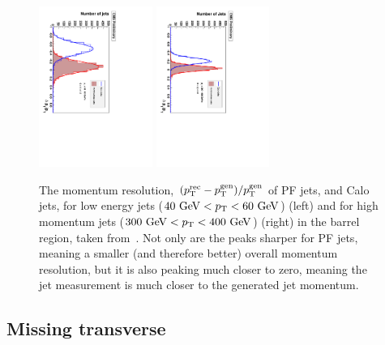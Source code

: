 \begin{figure}[htbp]
  \begin{center}
  \includegraphics[width=0.33\textwidth, angle =90]{Figures/detector/MomResPFjetCaloJet_lowPt.pdf}
  \includegraphics[width=0.33\textwidth, angle =90]{Figures/detector/MomResPFjetCaloJet_highPt.pdf}
  \caption{The momentum resolution, 
  $(p_{\text{T}}^{\text{rec}} - p_{\text{T}}^{\text{gen}})/p_{\text{T}}^{\text{gen}}$ of \ac{PF} jets, and Calo jets, for low energy jets ($40~\mathrm{GeV}<p_{\text{T}}<60~\mathrm{GeV}$) (left) and for high momentum jets ($300~\mathrm{GeV}<p_{\text{T}}<400~\mathrm{GeV}$) (right) in the barrel region, taken from~\cite{PFT-09-001}. Not only are the peaks sharper for \ac{PF} jets, meaning a smaller (and therefore better) overall momentum resolution, but it is also peaking much closer to zero, meaning the jet measurement is much closer to the generated jet momentum.}
  \label{fig:PFmomRes}
  \end{center}
\end{figure}


\subsection{Missing transverse }

